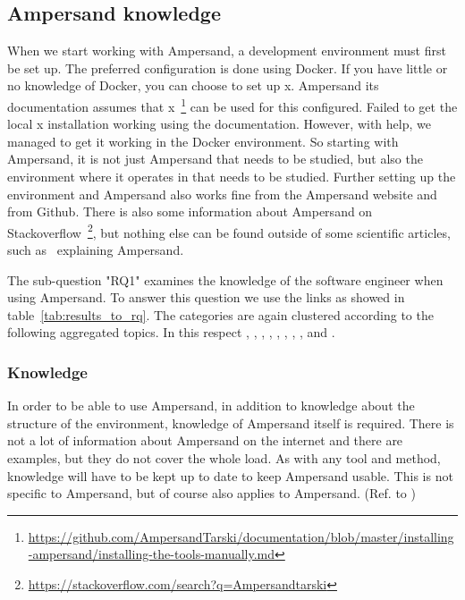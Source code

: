 \subsection{Ampersand knowledge}\label{subsection:ampersand-knowledge}

When we start working with Ampersand, a development environment must first be set up.
The preferred configuration is done using Docker.
If you have little or no knowledge of Docker, you can choose to set up \acrshort{x}.
Ampersand its documentation assumes that \acrshort{x}~\footnote{\url{https://github.com/AmpersandTarski/documentation/blob/master/installing-ampersand/installing-the-tools-manually.md}} can be used for this configured.
Failed to get the local \acrshort{x} installation working using the documentation.
However, with help, we managed to get it working in the Docker environment.
So starting with Ampersand, it is not just Ampersand that needs to be studied, but also the environment where it operates in that needs to be studied.
Further setting up the environment and Ampersand also works fine from the Ampersand website and from Github.
There is also some information about Ampersand on Stackoverflow~\footnote{\url{https://stackoverflow.com/search?q=Ampersandtarski}}, but nothing else can be found outside of some scientific articles, such as~\cite{de_swart_ampersand_2011} explaining Ampersand.

The sub-question "\acrlong{RQ1}" examines the knowledge of the software engineer when using Ampersand.
To answer this question we use the links as showed in table~\ref{tab:results_to_rq}.
The categories are again clustered according to the following aggregated topics. In this respect , , , , , , , ,  and .

\subsubsection{Knowledge}\label{subsub:1_knowledge}
In order to be able to use Ampersand, in addition to knowledge about the structure of the environment, knowledge of Ampersand itself is required.
There is not a lot of information about Ampersand on the internet and there are examples, but they do not cover the whole load.
As with any tool and method, knowledge will have to be kept up to date to keep Ampersand usable.
This is not specific to Ampersand, but of course also applies to Ampersand.
(Ref. to )


